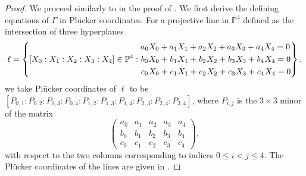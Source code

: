 \documentclass[a4paper,reqno]{amsart}
\numberwithin{equation}{section}
\newcommand{\p}{\mathbb{P}}
\numberwithin{equation}{section}
\begin{document}
\begin{proof}
    We proceed similarly to in the proof of . 
    We first derive the defining equations of $\Gamma$ in Pl\"ucker coordinates.
    For a projective line in $\p^4$ defined as the intersection of three hyperplanes
    \begin{equation*}
        \ell = \left\{ [X_0:X_1:X_2:X_3:X_4]\in \p^4  : 
        \begin{aligned}
            &a_0 X_0+a_1X_1+a_2X_2+a_3X_3 + a_4 X_4=0 \\
            &\hspace{0.2mm}b_0\hspace{0.2mm} X_0+\hspace{0.2mm}b_1\hspace{0.2mm}X_1+\hspace{0.2mm}b_2\hspace{0.2mm}X_2+\hspace{0.2mm}b_3\hspace{0.2mm}X_3 + \hspace{0.2mm}b_4\hspace{0.2mm} X_4=0 \\
            &\hspace{0.2mm}c_0\hspace{0.2mm} X_0+\hspace{0.2mm}c_1\hspace{0.2mm}X_1+\hspace{0.2mm}c_2\hspace{0.2mm}X_2+\hspace{0.2mm}c_3\hspace{0.2mm}X_3 + \hspace{0.2mm}c_4\hspace{0.2mm} X_4=0 
        \end{aligned}
        \right\},
    \end{equation*}  
    we take Pl\"ucker coordinates of $\ell$ to be $[P_{0,1}:P_{0,2}:P_{0,3}:P_{0,4}:P_{1,2}:P_{1,3}:P_{1,4}:P_{2,3}:P_{2,4}:P_{3,4}]$, where $P_{i,j}$ is the $3\times 3$ minor of the matrix 
    $$\left(\begin{array}{ccccc}a_0 & a_1 & a_2 & a_3 & a_4 \\b_0 & b_1 & b_2 & b_3 & b_4 \\c_0 & c_1 & c_2 & c_3 & c_4\end{array}\right),$$
    with respect to the two columns corresponding to indices $0\leq i<j\leq 4$.
    The Pl\"ucker coordinates of the lines are given in .

\end{proof}
\end{document}
